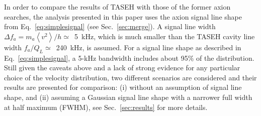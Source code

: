 \documentclass[%
reprint, %
superscriptaddress,
 amsmath,amssymb,
 aps
]{revtex4-2}
\begin{document}
In order to compare the results of TASEH with those of the former axion 
searches, the analysis presented in this paper uses the axion signal line shape
 from Eq.~\eqref{eq:simplesignal} (see Sec.~\ref{sec:merge}). 
A signal line width $\Delta f_a=m_a\left<v^2\right>/h\simeq$~5~kHz, which is 
much smaller than the TASEH cavity line width $f_a/Q_L\simeq$~240~kHz, is 
assumed. For a signal line shape as described in Eq.~\eqref{eq:simplesignal}, 
a 5-kHz bandwidth includes about 95\% of the distribution. 
Still given the caveats above and a lack of strong evidence for any particular
 choice of the velocity distribution, two different scenarios are considered 
and their results are presented for comparison: (i) without an assumption of 
signal line shape, and (ii) assuming a Gaussian signal line shape with a 
narrower full width at half maximum (FWHM), see Sec.~\ref{sec:results} for more
 details. 


 
\end{document}
